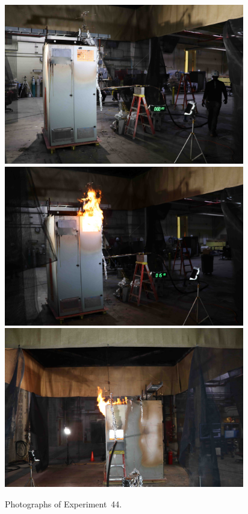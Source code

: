 \begin{figure}[p]
\centering
\includegraphics[height=2.75in]{../FIGURES/Test_44_start} \\
\includegraphics[height=2.75in]{../FIGURES/Test_44_15_min_19_s} \\
\includegraphics[height=2.75in]{../FIGURES/Test_44_side}
\caption[Photographs of Experiment~44]{Photographs of Experiment~44.}
\label{fig:Test_44_photos}
\end{figure}


\clearpage


